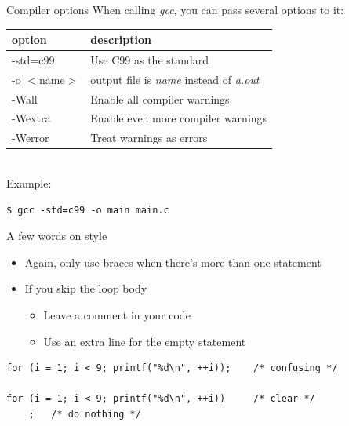 \begin{frame}[fragile]{Compiler options}
	When calling \textit{gcc}, you can pass several options to it:\\
	\bigskip
	\begin{tabular}{|l|l|}
		\hline
		\textbf{option} & \textbf{description} \\\hline
		-std=c99 & Use C99 as the standard \\\hline
		-o $<$name$>$ & output file is \textit{name} instead of \textit{a.out} \\\hline
		-Wall & Enable all compiler warnings \\\hline
		-Wextra & Enable even more compiler warnings \\\hline
		-Werror & Treat warnings as errors \\\hline
	\end{tabular}\\
	\bigskip
	Example:
	\begin{lstlisting}[numbers=none]
$ gcc -std=c99 -o main main.c
\end{lstlisting}
\end{frame}

\begin{frame}[fragile]{A few words on style}
	\begin{itemize}
		\item Again, only use braces when there's more than one statement
		\item If you skip the loop body
		\begin{itemize}
			\item Leave a comment in your code
			\item Use an extra line for the empty statement
		\end{itemize}
	\end{itemize}
		\begin{lstlisting}[numbers=none]
for (i = 1; i < 9; printf("%d\n", ++i));	/* confusing */

for (i = 1; i < 9; printf("%d\n", ++i))		/* clear */
	;	/* do nothing */
\end{lstlisting}
\end{frame}

